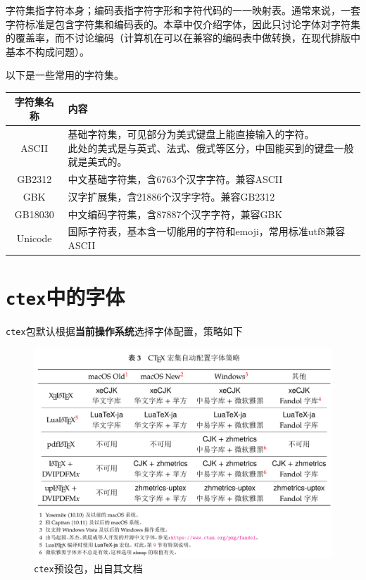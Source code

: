 \documentclass[10pt,openany]{book}
\begin{document}
\begin{sloppypar}
    字符集指字符本身；编码表指字符字形和字符代码的一一映射表。通常来说，一套字符标准是包含字符集和编码表的。本章中仅介绍字体，因此只讨论字体对字符集的覆盖率，而不讨论编码（计算机在可以在兼容的编码表中做转换，在现代排版中基本不构成问题）。

    以下是一些常用的字符集。

    \begin{center}
        \begin{longtable}{cl}
            \textbf{字符集名称} & \textbf{内容}                            \\
            \hline
            \endfirsthead
            ASCII          & \makecell{基础字符集，可见部分为美式键盘上能直接输入的字符。    \\此处的美式是与英式、法式、俄式等区分，中国能买到的键盘一般就是美式的。}\\
            \hline
            GB2312         & 中文基础字符集，含6763个汉字字符。兼容ASCII             \\
            \hline
            GBK            & 汉字扩展集，含21886个汉字字符。兼容GB2312             \\
            \hline
            GB18030        & 中文编码字符集，含87887个汉字字符，兼容GBK              \\
            \hline
            Unicode        & 国际字符表，基本含一切能用的字符和emoji，常用标准utf8兼容ASCII \\
            \hline
        \end{longtable}
    \end{center}

    \section{\texttt{ctex}中的字体}

    \texttt{ctex}包默认根据\textbf{当前操作系统}选择字体配置，策略如下

    \begin{figure}[H]
        \centering
        \includegraphics[width=\linewidth]{data/ctex.png}
        \caption{\texttt{ctex}预设包，出自其文档}
    \end{figure}


\end{sloppypar}
\end{document}
